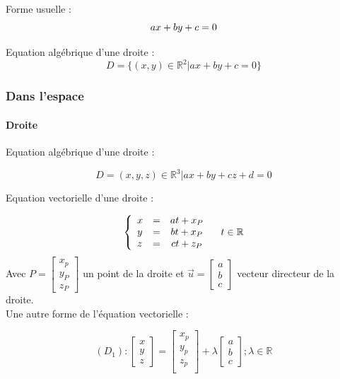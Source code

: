 \documentclass[12pt,a4paper,twoside]{article}
\numberwithin{equation}{subsection}
\begin{document}
Forme usuelle : 
\begin{equation}
ax+by+c=0\\
\end{equation}


Equation algébrique d'une droite :
\begin{equation}
D=\{(x,y) \in \mathbb{R} ^2 |ax+by+c=0\}
\end{equation}

\subsubsection{Dans l'espace}
\paragraph{Droite}
Equation algébrique d'une droite :

\begin{equation}
D={(x,y,z) \in \mathbb{R} ^3 |ax+by+cz+d=0}
\end{equation}

Equation vectorielle d'une droite :

\begin{eqnarray}
\left\{
\begin{array}{l c c r}   
x &=& a t+ x_P &\\
y &=& b t+ x_P & \\
z &=& c t + z_P & 
\end{array}\right.
t \in \mathbb{R}
\end{eqnarray}
Avec 
$P=
\begin{bmatrix}
x_p \\
y_P\\
z_P
\end{bmatrix}
$ 
un point de la droite et $\vec{u}=\begin{bmatrix}
a\\ b\\ c
\end{bmatrix}$ vecteur directeur de la droite.\\

Une autre forme de l'équation vectorielle :

\begin{equation}
(D_1):
\begin{bmatrix}
x \\
y\\
z
\end{bmatrix}
=
\begin{bmatrix}
x_p\\
y_p\\
z_p\\
\end{bmatrix}
+
\lambda
\begin{bmatrix}
a\\
b \\
c
\end{bmatrix}
; \lambda \in \mathbb{R}
\end{equation}
\end{document}
